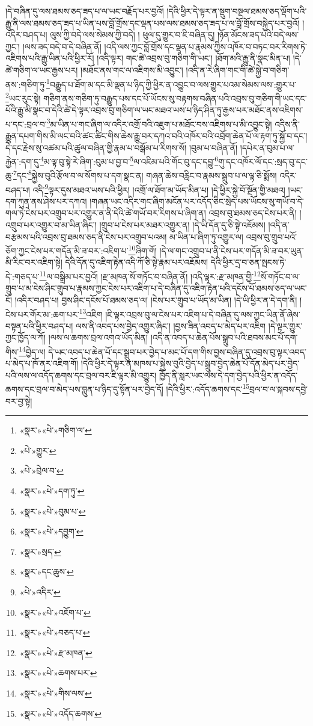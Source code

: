།དེ་བཞིན་དུ་ལས་ཐམས་ཅད་ཟད་པ་ལ་ཡང་བརྗོད་པར་བྱའོ། །དེའི་ཕྱིར་དེ་ལྟར་ན་སྡུག་བསྔལ་ཐམས་ཅད་ལྡོག་པའི་རྒྱུ་ནི་ལས་ཐམས་ཅད་ཟད་པ་ཡིན་པས་བློ་གྲོས་དང་ལྡན་པས་ལས་ཐམས་ཅད་ཟད་པ་ལ་བློ་གྲོས་བསྐྱེད་པར་བྱའོ། །འདིར་བཤད་པ། ལུས་ཀྱི་བདེ་ལས་སེམས་ཀྱི་བདེ། །
ཕུལ་དུ་གྱུར་བ་ཇི་བཞིན་དུ། །ཉོན་མོངས་ཟད་པའི་བདེ་ལས་ཀྱང་། །ལས་ཟད་བདེ་བ་དེ་བཞིན་ནོ། །འདི་ལས་ཀྱང་བློ་གྲོས་དང་ལྡན་པ་རྣམས་ཀྱིས་འཁོར་བ་བཏང་བར་རིགས་ཏེ་འཇིགས་པའི་རྒྱུ་ཡིན་པའི་ཕྱིར་རོ། །འདི་ལྟར། གང་ཚེ་འབྲས་བུ་གཅིག་གི་ཡང་། །ཐོག་མའི་རྒྱུ་ནི་སྣང་མིན་པ། །དེ་ཚེ་གཅིག་ལ་ཡང་རྒྱས་པར། །མཐོང་ནས་གང་ལ་འཇིགས་མི་འབྱུང་། །འདི་ན་རེ་ཞིག་གང་གི་ཚེ་སྐྱེ་བ་གཅིག་ནས་:གཅིག་ཏུ་\footnote{«སྣར་»«པེ་»གཅིག་ལ་}བརྒྱུད་པ་ཐོག་མ་དང་མི་ལྡན་པ་ཉིད་ཀྱི་ཕྱིར་ན་འབྱུང་བ་ལས་གྱུར་པའམ་སེམས་ལས་:གྱུར་པ་\footnote{«པེ་»གྱུར་}ཡང་རུང་སྟེ། གཅིག་ནས་གཅིག་ཏུ་བརྒྱུད་པས་དང་པོ་ཡོངས་སུ་བརྟགས་བཞིན་པའི་འབྲས་བུ་གཅིག་གི་ཡང་དང་པོའི་རྒྱུ་མི་སྣང་བ་དེའི་ཚེ་དེ་ལྟར་འབྲས་བུ་གཅིག་ལ་ཡང་མཐའ་ཡས་པ་ཉིད་ཤིན་ཏུ་རྒྱས་པར་མཐོང་ནས་འཇིགས་པ་དང་:བྲལ་བ་\footnote{«པེ་»བྲེལ་བ་}མ་ཡིན་པ་གང་ཞིག་ལ་འདིར་འགྲོ་བའི་འཇུག་པ་མཐོང་བས་འཇིགས་པ་མི་འབྱུང་སྟེ། འདིས་ནི་རྒྱུན་དཔག་གིས་མི་ལང་བའི་ཚང་ཚིང་གིས་ཆེས་རྒྱུ་བར་དཀའ་བའི་འཁོར་བའི་འབྲོག་ཆེན་པོ་ལ་རྟག་ཏུ་སྐྱོ་བ་དང་། དེ་དང་རྗེས་སུ་འཚམ་པའི་ཚུལ་བཞིན་གྱི་རྣམ་པ་བསྒོམ་པ་རིགས་སོ། །བུམ་པ་བཞིན་ནོ། །དཔེར་ན་བུམ་པ་ལ་རྐྱེན་:དག་དུ་\footnote{«སྣར་»«པེ་»དག་ཏུ་}མ་ལྟ་བུ་སྟེ་རེ་ཞིག་:བུམ་པ་བྱ་བ་\footnote{«སྣར་»«པེ་»བུམ་པ་}ལ་འཇིམ་པའི་གོང་བུ་དང་དབྱུ་\footnote{«སྣར་»«པེ་»དབྱུག་}གུ་དང་འཁོར་ལོ་དང་:སྲད་བུ་དང་ཆུ་\footnote{«སྣར་»སྲད་}དང་\footnote{«སྣར་»དང་ཆུས་}སྐྱེས་བུའི་རྩོལ་བ་ལ་སོགས་པ་དག་སྣང་ན། གཞན་ཆེས་བརླིང་བ་རྣམས་སྒྲུབ་པ་ལ་ལྟ་ཅི་སྨོས། འདིར་བཤད་པ། འདི་\footnote{«པེ་»འདིར་}ལྟར་དུས་མཐའ་ཡས་པའི་ཕྱིར། །འགྲོ་ལ་ཐོག་མ་ཡོད་མིན་པ། །དེ་ཕྱིར་སྐྱེ་བོ་སྔོན་གྱི་མཐའ། །ཡང་དག་ཀུན་ནས་ཤེས་པར་དཀའ། །གཞན་ཡང་འདིར་གང་ཞིག་མངོན་པར་འདོད་ཅིང་སྲེད་པས་ཡོངས་སུ་གཡོ་བ་དེ་གལ་ཏེ་ངེས་པར་འགྲུབ་པར་འགྱུར་ན་ནི་དེའི་ཚེ་གཡོ་བར་རིགས་པ་ཞིག་ན། འབྲས་བུ་ཐམས་ཅད་ངེས་པར་ནི། །འགྲུབ་པར་འགྱུར་བ་མ་ཡིན་ཞིང་། །གྲུབ་པ་ངེས་པར་མཐར་འགྱུར་ན། །དེ་ཡི་དོན་དུ་ཅི་སྟེ་འཇོམས། །འདི་ན་བརྩམས་པའི་འབྲས་བུ་ཐམས་ཅད་ནི་ངེས་པར་འགྲུབ་པའམ། མ་ཡིན་པ་ཞིག་ཏུ་འགྱུར་ལ། འབྲས་བུ་གྲུབ་པའོ་ཅོག་ཀྱང་ངེས་པར་གདོན་མི་ཟ་བར་:འཇིག་པ་\footnote{«སྣར་»«པེ་»འཇོག་པ་}ཞིག་གོ། །དེ་ལ་གང་འགྲུབ་པ་ནི་ངེས་པར་གདོན་མི་ཟ་བར་ཡུན་མི་རིང་བར་འཇིག་སྟེ། དེའི་དོན་དུ་འཇིག་རྟེན་འདི་ཀོ་ཅི་སྟེ་རྣམ་པར་འཇོམས། དེའི་ཕྱིར་དྲ་བ་ཅན་སྤངས་ཏེ་དེ་:གཅད་པ་\footnote{«སྣར་»«པེ་»བཅད་པ་}ལ་བསྒྲིམ་པར་བྱའོ། །རྫ་མཁན་སོ་གཏོང་བ་བཞིན་ནོ། །འདི་ལྟར་:རྫ་མཁན་གྱི་\footnote{«སྣར་»«པེ་»རྫ་མཁན་}སོ་གཏོང་བ་ལ་གྲུབ་པ་མ་ངེས་ཤིང་གྲུབ་པ་རྣམས་ཀྱང་ངེས་པར་འཇིག་པ་དེ་བཞིན་དུ་འཇིག་རྟེན་པའི་དངོས་པོ་ཐམས་ཅད་ལ་ཡང་ངོ། །འདིར་བཤད་པ། བྱས་ཤིང་དངོས་པོ་ཐམས་ཅད་ལ། །ངེས་པར་གྲུབ་པ་ཡོད་མ་ཡིན། །དེ་ཡི་ཕྱིར་ན་དེ་དག་ནི། །ངེས་པར་གོར་མ་:ཆག་པར་\footnote{«སྣར་»«པེ་»ཆགས་པར་}འཇིག །ཇི་ལྟར་འབྲས་བུ་ལ་ངེས་པར་འཇིག་པ་དེ་བཞིན་དུ་ལས་ཀྱང་ཡིན་ནོ་ཞེས་བསྟན་པའི་ཕྱིར་བཤད་པ། ལས་ནི་འབད་པས་བྱེད་འགྱུར་ཞིང་། །བྱས་ཟིན་འབད་པ་མེད་པར་འཇིག །དེ་ལྟར་གྱུར་ཀྱང་ཁྱོད་ལ་ཀོ། །ལས་ལ་ཆགས་བྲལ་འགའ་ཡོད་མིན། །འདི་ན་འབད་པ་ཆེན་པོས་སྒྲུབ་པའི་ཐབས་མང་པོ་དག་གིས་\footnote{«སྣར་»«པེ་»གིས་ལས་}བྱེད་ལ། དེ་ཡང་འབད་པ་ཆེན་པོ་དང་སྒྲུབ་པར་བྱེད་པ་མང་པོ་དག་གིས་བྱས་བཞིན་དུ་འབྲས་བུ་ལྟར་འབད་པ་མེད་པ་ཁོ་ནར་འཇིག་གོ། །དེའི་ཕྱིར་དེ་ལྟར་ན་མཁས་པ་སྐྱེས་བུའི་བྱེད་པ་སྒྲུབ་བྱེད་ཆེན་པོ་དོན་མེད་པར་བྱེད་པའི་ལས་ལ་འདོད་ཆགས་དང་བྲལ་བར་ཇི་ལྟར་མི་འགྱུར། ཁྱོད་ནི་སླར་ཡང་ལས་དེ་དག་བྱེད་པའི་ཕྱིར་ན་འདོད་ཆགས་དང་བྲལ་བ་མེད་པས་བླུན་པ་ཉིད་དུ་སྟོན་པར་བྱེད་དོ། །དེའི་ཕྱིར་:འདོད་ཆགས་དང་\footnote{«སྣར་»«པེ་»འདོད་ཆགས་}བྲལ་བ་ལ་སྐབས་དབྱེ་བར་བྱ་སྟེ། 
